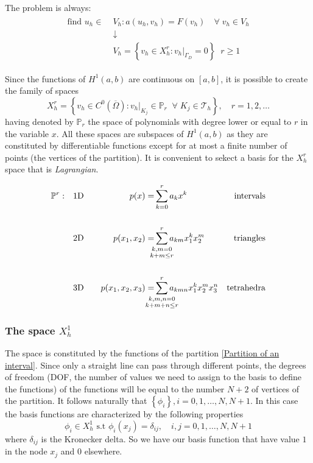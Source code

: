 The problem is always: 
\begin{align}
    \begin{split} 
        \text{find } u_h \in \;&V_h : a(u_h, v_h) = F(v_h) \quad \forall \; v_h \in V_h \\
        &\downarrow\\
        &V_h = \left\lbrace v_h \in X^r_h : v_h\vert_{\Gamma_D} = 0\right\rbrace \; \; r \geq 1 \label{Galerkin weak formulation}
    \end{split}   
\end{align}

Since the functions of \(H^1(a,b)\) are continuous on \([a,b]\), it is possible to create the family of spaces 
\begin{equation}
    X_h^r = \left\{v_h \in C^0\left(\overline{\Omega}\right) : v_h \vert_{K_j} \in \mathbb{P}_r \;\; \forall \; K_j \in \mathcal{T}_h\right\}, \quad r= 1,2,\ldots \label{Family of spaces FEM}
\end{equation}
having denoted by \(\mathbb{P}_r\) the space of polynomials with degree lower or equal to \(r\) in the variable \(x\). All these spaces are subspaces of \(H^1(a,b)\) as they are constituted by differentiable functions except for at most a finite number of points (the vertices of the partition). It is convenient to sekect a basis for the \(X^r_h\) space that is \textit{Lagrangian}.

    \begin{align*}
        \mathbb{P}^r:\quad &\text{1D} \quad &p(x) =& \sum_{k=0}^r a_k x^k &\text{intervals} \\
        \\
                      &\text{2D}  \quad &p(x_1, x_2) =& \sum_{\mathclap{\substack{k,m=0 \\ k + m \leq r}}}^r a_{km} x_1^k x_2^m  &\text{triangles} \\
         \\
                      &\text{3D} \quad &p(x_1, x_2, x_3) =& \sum_{\mathclap{\substack{k,m,n=0 \\ k + m + n  \leq r}}}^r a_{kmn} x_1^k x_2^m x_3^n &\text{tetrahedra}
    \end{align*}

\subsubsection*{The space \(X^1_h\)}
The space is constituted by the functions of the partition \eqref{Partition of an interval}. Since only a straight line can pass through different points, the degrees of freedom (DOF, the number of values we need to assign to the basis to define the functions)  of the functions will be equal to the number \(N+2\) of vertices of the partition. It follows naturally that \(\left\lbrace\phi_i\right\rbrace, i = 0, 1, \ldots, N, N+1\).
In this case the basis functions are characterized by the following properties 
\[
    \phi_i \in X^1_h \text{ s.t } \phi_i(x_j) = \delta_{ij}, \quad i, j = 0, 1, \ldots, N, N+1
\]
where \(\delta_{ij}\) is the Kronecker delta. So we have our basis function that have value \(1\) in the node \(x_j\) and \(0\) elsewhere.

